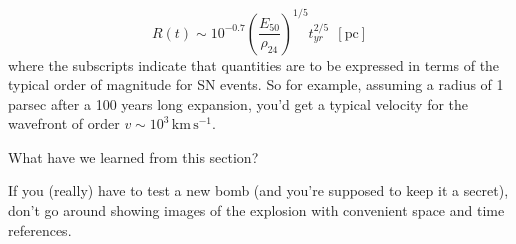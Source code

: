 \begin{equation*}
    R(t)\sim 10^{-0.7}\left(\frac{E_{50}}{\rho_{24}}\right)^{1/5}t_{yr}^{2/5}\,\;[\text{pc}]
\end{equation*}
where the subscripts indicate that quantities are to be expressed in terms of the typical order of magnitude for SN events. So for example, assuming a radius of 1 parsec after a 100 years long expansion, you'd get a typical velocity for the wavefront of order $v \sim 10^{3}\,\text{km}\,\text{s}^{-1}$.
\par What have we learned from this section?
\par If you (really) have to test a new bomb (and you're supposed to keep it a secret), don't go around showing images of the explosion with convenient space and time references.